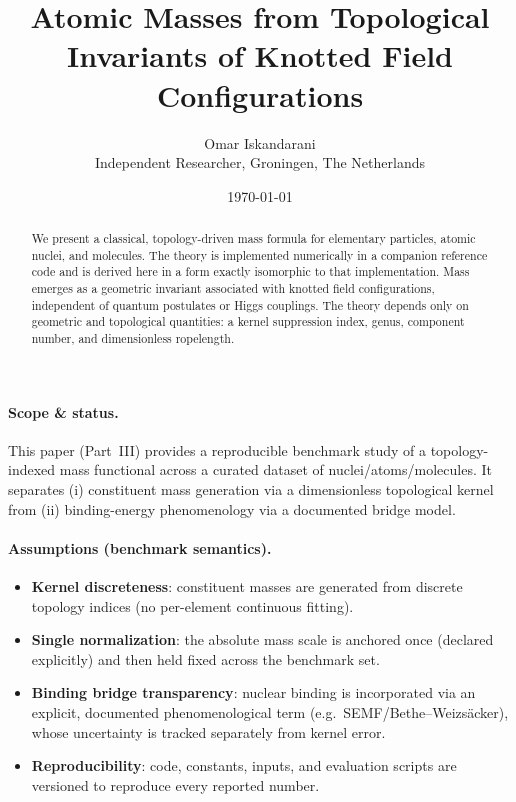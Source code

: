 \documentclass[11pt,a4paper]{article}
\title{\textbf{Atomic Masses from Topological Invariants of Knotted Field Configurations}}
\author{Omar Iskandarani\\
Independent Researcher, Groningen, The Netherlands}
\date{\today}
\begin{document}
    \maketitle

    \begin{abstract}
        We present a classical, topology-driven mass formula for elementary particles,
        atomic nuclei, and molecules.
        The theory is implemented numerically in a companion reference code and is
        derived here in a form exactly isomorphic to that implementation.
        Mass emerges as a geometric invariant associated with knotted field
        configurations, independent of quantum postulates or Higgs couplings.
        The theory depends only on geometric and topological quantities: a kernel
        suppression index, genus, component number, and dimensionless ropelength.
    \end{abstract}

\paragraph{Scope \& status.}
This paper (Part~III) provides a reproducible benchmark study of a topology-indexed mass functional across a curated dataset of nuclei/atoms/molecules. It separates (i) constituent mass generation via a dimensionless topological kernel from (ii) binding-energy phenomenology via a documented bridge model.

\paragraph{Assumptions (benchmark semantics).}
\begin{itemize}
    \item \textbf{Kernel discreteness}: constituent masses are generated from discrete topology indices (no per-element continuous fitting).
    \item \textbf{Single normalization}: the absolute mass scale is anchored once (declared explicitly) and then held fixed across the benchmark set.
    \item \textbf{Binding bridge transparency}: nuclear binding is incorporated via an explicit, documented phenomenological term (e.g.\ SEMF/Bethe--Weizs\"acker), whose uncertainty is tracked separately from kernel error.
    \item \textbf{Reproducibility}: code, constants, inputs, and evaluation scripts are versioned to reproduce every reported number.
\end{itemize}
\end{document}
